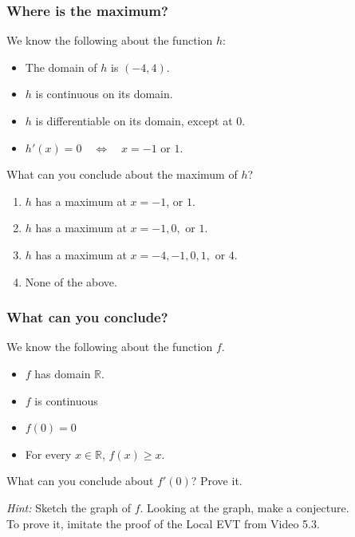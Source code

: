 \documentclass[14pt]{beamer}
\begin{document}
\begin{frame}[t]
	\frametitle{Where is the maximum?}

	We know the following about the function $h$:
	\begin{itemize}
		\item The domain of $h$ is $\displaystyle (-4,4)$.

		\item $h$ is continuous on its domain.

		\item $h$ is differentiable on its domain, except at $0$.

		\item $h'(x) = 0 \quad \iff \quad x=-1 \text{ or }1$.
	\end{itemize}

	\begin{block}{What can you conclude about the maximum of $h$?}
		\begin{enumerate}
			\item $h$ has a maximum at $x=-1$, or $1$.

			\item $h$ has a maximum at $x=-1,0,$ or $1$.

			\item $h$ has a maximum at $x=-4, -1,0, 1,$ or $4$.

			\item None of the above.
		\end{enumerate}
	\end{block}
\end{frame}

\begin{frame}[t]
	\frametitle{What can you conclude?}

	We know the following about the function $f$.
	\begin{itemize}
		\item $f$ has domain $\mathbb{R}$.

		\item $f$ is continuous

		\item $f(0)=0$

		\item For every $x \in \mathbb{R}$, $f(x) \geq x$.
	\end{itemize}
	\begin{block}{}
		What can you conclude about $f'(0)$? Prove it.
	\end{block}

	\vfill

	\emph{Hint:} Sketch the graph of $f$. Looking at the graph, make a conjecture.
	\\ To prove it, imitate the proof of the Local EVT from Video 5.3.
\end{frame}
\end{document}
